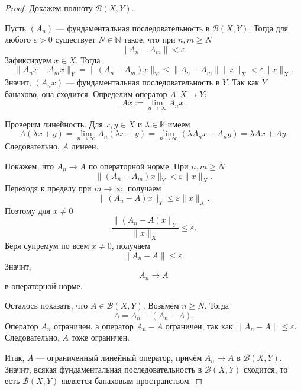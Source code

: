 \begin{proof}
	Докажем полноту $\mathcal B(X,Y)$.
	
	Пусть $(A_n)$ --- фундаментальная последовательность в $\mathcal B(X,Y)$.
	Тогда для любого $\varepsilon>0$ существует $N\in\mathbb N$ такое, что при
	$n,m\ge N$
	\[
	\|A_n-A_m\|<\varepsilon.
	\]
	Зафиксируем $x\in X$. Тогда
	\[
	\|A_nx-A_mx\|_Y
	=
	\|(A_n-A_m)x\|_Y
	\le
	\|A_n-A_m\|\|x\|_X
	<
	\varepsilon\|x\|_X.
	\]
	Значит, $(A_nx)$ --- фундаментальная последовательность в $Y$.
	Так как $Y$ банахово, она сходится. Определим оператор $A:X\to Y$:
	\[
	Ax:=\lim_{n\to\infty}A_nx.
	\]
	
	Проверим линейность. Для $x,y\in X$ и $\lambda\in\mathbb K$ имеем
	\[
	A(\lambda x+y)
	=
	\lim_{n\to\infty}A_n(\lambda x+y)
	=
	\lim_{n\to\infty}(\lambda A_nx+A_ny)
	=
	\lambda Ax+Ay.
	\]
	Следовательно, $A$ линеен.
	
	Покажем, что $A_n\to A$ по операторной норме. При $n,m\ge N$
	\[
	\|(A_n-A_m)x\|_Y<\varepsilon\|x\|_X.
	\]
	Переходя к пределу при $m\to\infty$, получаем
	\[
	\|(A_n-A)x\|_Y\le \varepsilon\|x\|_X.
	\]
	Поэтому для $x\ne 0$
	\[
	\frac{\|(A_n-A)x\|_Y}{\|x\|_X}\le \varepsilon.
	\]
	Беря супремум по всем $x\ne 0$, получаем
	\[
	\|A_n-A\|\le \varepsilon.
	\]
	Значит,
	\[
	A_n\to A
	\]
	в операторной норме.
	
	Осталось показать, что $A\in\mathcal B(X,Y)$. Возьмём $n\ge N$. Тогда
	\[
	A=A_n-(A_n-A).
	\]
	Оператор $A_n$ ограничен, а оператор $A_n-A$ ограничен, так как
	$\|A_n-A\|\le\varepsilon$. Следовательно, $A$ тоже ограничен.
	
	Итак, $A$ --- ограниченный линейный оператор, причём $A_n\to A$ в
	$\mathcal B(X,Y)$. Значит, всякая фундаментальная последовательность в
	$\mathcal B(X,Y)$ сходится, то есть $\mathcal B(X,Y)$ является банаховым
	пространством.
\end{proof}